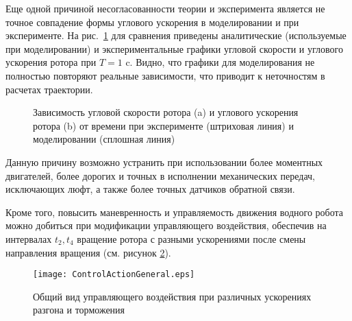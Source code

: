 Еще одной причиной несогласованности теории и эксперимента является не точное совпадение формы углового ускорения в моделировании и при эксперименте. На рис.~\ref{OmegaT1EpsilonT1} для сравнения приведены аналитические (используемые при моделировании) и экспериментальные графики угловой скорости и углового ускорения ротора при $ T = 1 $ c. Видно, что графики для моделирования не полностью повторяют реальные зависимости, что приводит к неточностям в расчетах траектории.

\begin{figure}[!ht]
	\begin{minipage}[h]{0.5\linewidth}
	\end{minipage}
	\hfill
	\begin{minipage}[h]{0.5\linewidth}
	\end{minipage}
	\caption{Зависимость угловой скорости ротора (a) и углового ускорения ротора (b) от времени при эксперименте (штриховая линия) и моделировании (сплошная линия)}
	\label{OmegaT1EpsilonT1}
\end{figure}


Данную причину возможно устранить при использовании более моментных двигателей, более дорогих и точных в исполнении механических передач, исключающих люфт, а также более точных датчиков обратной связи.

Кроме того, повысить маневренность и управляемость движения водного робота можно добиться при модификации управляющего воздействия, обеспечив на интервалах $t_2,t_4 $ вращение ротора с разными ускорениями после смены направления вращения (см. рисунок \ref{gen_cont_ac}).    

\begin{figure}[!ht]
	\centering
	\texttt{[image: ControlActionGeneral.eps]}
	\caption{Общий вид управляющего воздействия при различных ускорениях разгона и торможения}
	\label{gen_cont_ac}
\end{figure}



\clearpage